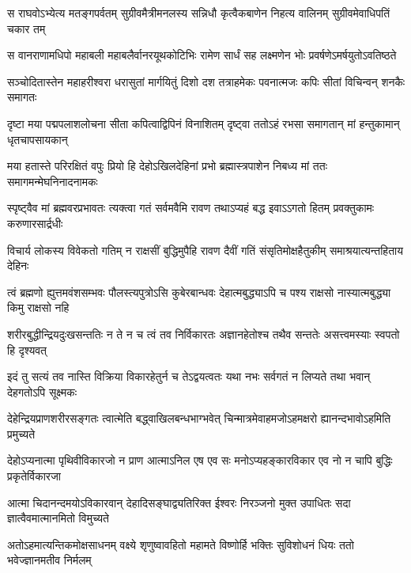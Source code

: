 \fourlineindentedshloka
{स राघवोऽभ्येत्य मतङ्गपर्वतम्}
{सुग्रीवमैत्रीमनलस्य सन्निधौ}
{कृत्वैकबाणेन निहत्य वालिनम्}
{सुग्रीवमेवाधिपतिं चकार तम्} %

\fourlineindentedshloka
{स वानराणामधिपो महाबली}
{महाबलैर्वानरयूथकोटिभिः}
{रामेण सार्धं सह लक्ष्मणेन भोः}
{प्रवर्षणेऽमर्षयुतोऽवतिष्ठते} %

\fourlineindentedshloka
{सञ्चोदितास्तेन महाहरीश्वरा}
{धरासुतां मार्गयितुं दिशो दश}
{तत्राहमेकः पवनात्मजः कपिः}
{सीतां विचिन्वन् शनकैः समागतः} %

\fourlineindentedshloka
{दृष्टा मया पद्मपलाशलोचना}
{सीता कपित्वाद्विपिनं विनाशितम्}
{दृष्ट्वा ततोऽहं रभसा समागतान्}
{मां हन्तुकामान् धृतचापसायकान्} %

\fourlineindentedshloka
{मया हतास्ते परिरक्षितं वपुः}
{प्रियो हि देहोऽखिलदेहिनां प्रभो}
{ब्रह्मास्त्रपाशेन निबध्य मां ततः}
{समागमन्मेघनिनादनामकः} %

\fourlineindentedshloka
{स्पृष्ट्वैव मां ब्रह्मवरप्रभावतः}
{त्यक्त्वा गतं सर्वमवैमि रावण}
{तथाऽप्यहं बद्ध इवाऽऽगतो हितम्}
{प्रवक्तुकामः करुणारसार्द्रधीः} %

\fourlineindentedshloka
{विचार्य लोकस्य विवेकतो गतिम्}
{न राक्षसीं बुद्धिमुपैहि रावण}
{दैवीं गतिं संसृतिमोक्षहैतुकीम्}
{समाश्रयात्यन्तहिताय देहिनः} %

\fourlineindentedshloka
{त्वं ब्रह्मणो ह्युत्तमवंशसम्भवः}
{पौलस्त्यपुत्रोऽसि कुबेरबान्धवः}
{देहात्मबुद्ध्याऽपि च पश्य राक्षसो}
{नास्यात्मबुद्ध्या किमु राक्षसो नहि} %

\fourlineindentedshloka
{शरीरबुद्धीन्द्रियदुःखसन्ततिः}
{न ते न च त्वं तव निर्विकारतः}
{अज्ञानहेतोश्च तथैव सन्ततेः}
{असत्त्वमस्याः स्वपतो हि दृश्यवत्} %

\fourlineindentedshloka
{इदं तु सत्यं तव नास्ति विक्रिया}
{विकारहेतुर्न च तेऽद्वयत्वतः}
{यथा नभः सर्वगतं न लिप्यते}
{तथा भवान् देहगतोऽपि सूक्ष्मकः}

\fourlineindentedshloka
{देहेन्द्रियप्राणशरीरसङ्गतः}
{त्वात्मेति बद्ध्वाखिलबन्धभाग्भवेत्} %
{चिन्मात्रमेवाहमजोऽहमक्षरो}
{ह्यानन्दभावोऽहमिति प्रमुच्यते}

\fourlineindentedshloka
{देहोऽप्यनात्मा पृथिवीविकारजो}
{न प्राण आत्माऽनिल एष एव सः} %
{मनोऽप्यहङ्कारविकार एव नो}
{न चापि बुद्धिः प्रकृतेर्विकारजा}

\fourlineindentedshloka
{आत्मा चिदानन्दमयोऽविकारवान्}
{देहादिसङ्घाद्व्यतिरिक्त ईश्वरः} %
{निरञ्जनो मुक्त उपाधितः सदा}
{ज्ञात्वैवमात्मानमितो विमुच्यते}

\fourlineindentedshloka
{अतोऽहमात्यन्तिकमोक्षसाधनम्}
{वक्ष्ये शृणुष्वावहितो महामते} %
{विष्णोर्हि भक्तिः सुविशोधनं धियः}
{ततो भवेज्ज्ञानमतीव निर्मलम्}

